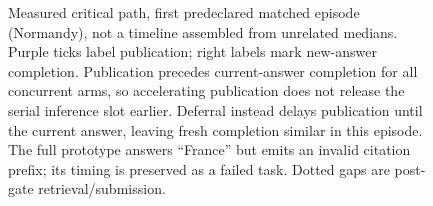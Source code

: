 \begin{figure}[t]
\centering
{}
\caption{Measured critical path, first predeclared matched episode (Normandy),
not a timeline assembled from unrelated medians. Purple ticks label publication;
right labels mark new-answer completion. Publication precedes current-answer
completion for all concurrent arms, so accelerating publication does not release
the serial inference slot earlier. Deferral instead delays publication until the
current answer, leaving fresh completion similar in this episode. The full
prototype answers ``France'' but emits an invalid citation prefix; its timing
is preserved as a failed task. Dotted gaps are post-gate retrieval/submission.}
\label{fig:research-episode}
\end{figure}
